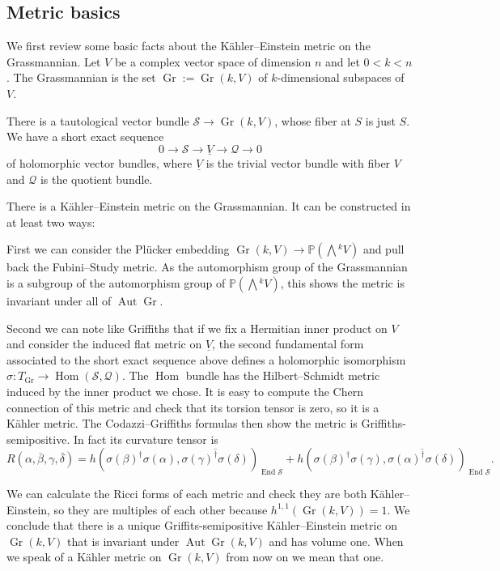 \documentclass[10pt,a4paper]{article}
\newcommand{\kk}[1]{\mathbb{#1}}
\newcommand{\cc}[1]{\mathcal{#1}}
\def\ov#1{\overline{#1}}
\DeclareMathOperator{\Gr}{Gr}
\DeclareMathOperator{\End}{End}
\DeclareMathOperator{\Aut}{Aut}
\DeclareMathOperator{\Hom}{Hom}
\begin{document}
\subsection*{Metric basics}

We first review some basic facts about the K\"ahler--Einstein metric
on the Grassmannian.
Let $V$ be a complex vector space of dimension $n$ and let
$0 < k < n$.
The Grassmannian is the set $\Gr := \Gr(k, V)$ of $k$-dimensional subspaces of $V$.

There is a tautological vector bundle $\cc S \to \Gr(k,V)$, whose fiber at $S$ is
just $S$.
We have a short exact sequence
\[
    0 \to \cc S \to \underline V \to \cc Q \to 0
\]
of holomorphic vector bundles, where $\underline V$ is the trivial vector bundle
with fiber $V$ and $\cc Q$ is the quotient bundle.

There is a K\"ahler--Einstein metric on the Grassmannian.
It can be constructed in at least two ways:

First we can consider the Pl\"{u}cker embedding $\Gr(k,V) \to \kk P(\bigwedge\!\!{}^k
V)$ and pull back the Fubini--Study metric.
As the automorphism group of the Grassmannian is a subgroup of the automorphism
group of $\kk P(\bigwedge\!\!{}^kV)$, this shows the metric is invariant under
all of $\Aut \Gr$.

Second we can note like Griffiths that if we fix a Hermitian inner product on
$V$ and consider the induced flat metric on $\underline V$, the second
fundamental form associated to the short exact sequence above defines a
holomorphic isomorphism $\sigma : T_{\Gr} \to \Hom(\cc S, \cc Q)$.
The $\Hom$ bundle has the Hilbert--Schmidt metric induced by the inner product
we chose.
It is easy to compute the Chern connection of this metric and check that its
torsion tensor is zero, so it is a K\"ahler metric.
The Codazzi--Griffiths formulas then show the metric is Griffiths-semipositive.
In fact its curvature tensor is
\[
R(\alpha,\ov\beta,\gamma,\ov\delta)
= h(\sigma(\beta)^\dagger \sigma(\alpha),
    \ov{\sigma(\gamma)^\dagger \sigma(\delta)})_{\End \cc S}
+ h(\sigma(\beta)^\dagger \sigma(\gamma),
    \ov{\sigma(\alpha)^\dagger \sigma(\delta)})_{\End \cc S}.
\]

We can calculate the Ricci forms of each metric and check they are both
K\"ahler--Einstein, so they are multiples of each other because $h^{1,1}(\Gr(k,
V)) = 1$.
We conclude that there is a unique Griffits-semipositive K\"ahler--Einstein
metric on $\Gr(k, V)$ that is invariant under $\Aut \Gr(k, V)$ and has volume
one. When we speak of a K\"ahler metric on $\Gr(k, V)$ from now on we mean
that one.
\end{document}
